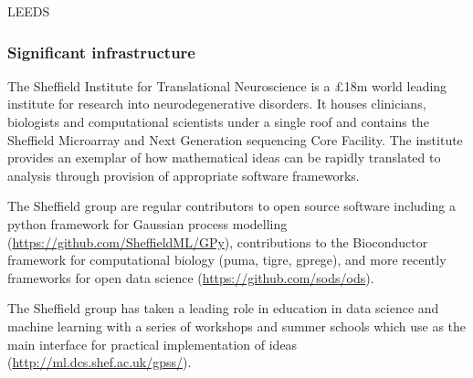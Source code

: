 \begin{sitedescription}{LEEDS}
\subsubsection*{Significant infrastructure}
\begin{compactenum}
\item The Sheffield Institute for Translational Neuroscience is a \pounds 18m world leading institute for research into neurodegenerative disorders. It houses clinicians, biologists and computational scientists under a single roof and contains the Sheffield Microarray and Next Generation sequencing Core Facility. The institute provides an exemplar of how mathematical ideas can be rapidly translated to analysis through provision of appropriate software frameworks.
\item The Sheffield group are regular contributors to open source software including a python framework for Gaussian process modelling (\url{https://github.com/SheffieldML/GPy}), contributions to the Bioconductor framework for computational biology (puma, tigre, gprege), and more recently frameworks for open data science (\url{https://github.com/sods/ods}).  
\item The Sheffield group has taken a leading role in education in data science and machine learning with a series of workshops and summer schools which use \Jupyter as the main interface for practical implementation of ideas (\url{http://ml.dcs.shef.ac.uk/gpss/}).

\end{compactenum}
\end{sitedescription}



